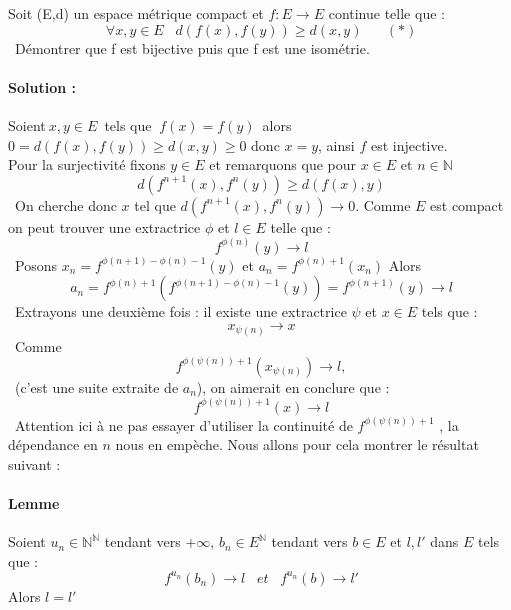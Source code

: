 \documentclass[letterpaper,10pt]{article}
\begin{document}
Soit (E,d) un espace métrique
 compact et \begin{math} 
f: E\rightarrow  E  
\end{math} continue  
telle que : \\ 
\[\
\forall x,y \in E\;\;\; d(f(x),f(y)) \geq d(x,y) \;\;\;\;\;\;(*)
\]\
Démontrer que f est bijective puis que f est une isométrie.
\paragraph{Solution :} 
Soient\(\ x,y \in E \)\ tels que \(\ 
f(x) = f(y) \)\ alors $ 0 = d(f(x),f(y)) \geq d(x,y) \geq 0 $
donc $x= y $, ainsi $f$ est injective.\\
Pour la surjectivité fixons $y\in E$ et remarquons que pour $x\in E$ et $n\in \mathbb{N}$ \[\
d(f^{n+1}(x),f^{n}(y)) \geq d(f(x),y)
\]\ On cherche donc $x$ tel que $d(f^{n+1}(x),f^{n}(y)) \rightarrow 0$.
Comme $E$ est compact on peut trouver  une extractrice $\phi$ et $l\in E$ telle que : \[\ f^{\phi(n)}(y)\rightarrow l
\]\  Posons $x_n = f^{\phi(n+1)-\phi(n)-1}(y)$ et $a_n = f^{\phi(n)+1}(x_n)$
 Alors 
\[\ a_n = 
f^{\phi(n)+1}(f^{\phi(n+1)-\phi(n)-1}(y)) = f^{\phi(n+1)}(y) \rightarrow l
\]\ 
Extrayons une deuxième fois : il existe une extractrice $\psi$ et $x \in E$ tels que : 
\[\ x_{\psi(n)} \rightarrow x
\]\ Comme 
\[\ f^{\phi(\psi(n))+1}(x_{\psi(n)}) \rightarrow l,  \]\ (c'est une suite extraite de $a_n$), on aimerait en conclure que : 
\[\ f^{\phi(\psi(n))+1}(x) \rightarrow l
\]\ Attention ici à ne pas essayer d'utiliser la continuité de $f^{\phi(\psi(n))+1}$ , la dépendance en $n$ nous en empèche.
Nous allons pour cela montrer le résultat suivant : 
\paragraph{Lemme}
Soient $u_n \in \mathbb{N}^{\mathbb{N}}$ tendant vers $+\infty$, $b_n \in E^{\mathbb{N}} $ tendant vers $b \in E$ et $l,l'$  dans $E$ tels que : 
\[\ f^{u_n}(b_n) \rightarrow l \;\;\;et\;\;\;  f^{u_n}(b) \rightarrow l' \] Alors $l = l'$
\end{document}
